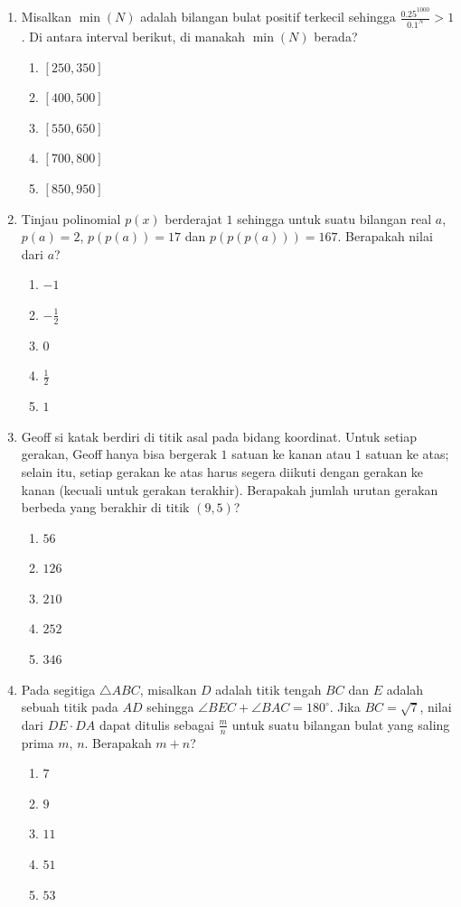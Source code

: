 \documentclass[12pt]{scrartcl}
\begin{document}
\begin{enumerate}
\item Misalkan $\min(N)$ adalah bilangan bulat positif terkecil sehingga $\frac{0.25^{1000}}{0.1^{N}}>1$. Di antara interval berikut, di manakah $\min(N)$ berada?
\begin{enumerate}
    \item $[250, 350]$
    \item $[400, 500]$
    \item $[550, 650]$
    \item $[700, 800]$
    \item $[850, 950]$
\end{enumerate}

\item Tinjau polinomial $p(x)$ berderajat $1$ sehingga untuk suatu bilangan real $a$, $p(a)=2$, $p(p(a))=17$ dan $p(p(p(a)))=167$. Berapakah nilai dari $a$?
\begin{enumerate}
    \item $-1$
    \item $-\frac{1}{2}$
    \item $0$
    \item $\frac{1}{2}$
    \item $1$
\end{enumerate}

\item Geoff si katak berdiri di titik asal pada bidang koordinat. Untuk setiap gerakan, Geoff hanya bisa bergerak $1$ satuan ke kanan atau $1$ satuan ke atas; selain itu, setiap gerakan ke atas harus segera diikuti dengan gerakan ke kanan (kecuali untuk gerakan terakhir). Berapakah jumlah urutan gerakan berbeda yang berakhir di titik $(9,5)$?
\begin{enumerate}
    \item $56$
    \item $126$
    \item $210$
    \item $252$
    \item $346$
\end{enumerate}

\item Pada segitiga $\triangle ABC$, misalkan $D$ adalah titik tengah $BC$ dan $E$ adalah sebuah titik pada $AD$ sehingga $\angle BEC+\angle BAC=180^{\circ}$. Jika $BC=\sqrt{7}$, nilai dari $DE \cdot DA$ dapat ditulis sebagai $\frac{m}{n}$ untuk suatu bilangan bulat yang saling prima $m$, $n$. Berapakah $m+n$?
\begin{enumerate}
    \item $7$
    \item $9$
    \item $11$
    \item $51$
    \item $53$
\end{enumerate}


\end{enumerate}
\end{document}
